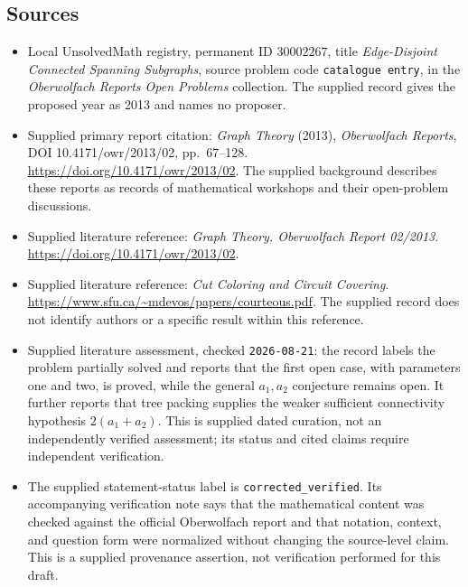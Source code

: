 \documentclass[11pt]{article}
\begin{document}
\subsection{Sources}
\begin{itemize}
\item Local UnsolvedMath registry, permanent ID \(30002267\), title \emph{Edge-Disjoint Connected Spanning Subgraphs}, source problem code \texttt{catalogue entry}, in the \emph{Oberwolfach Reports Open Problems} collection. The supplied record gives the proposed year as 2013 and names no proposer.
\item Supplied primary report citation: \emph{Graph Theory} (2013), \emph{Oberwolfach Reports}, DOI 10.4171/owr/2013/02, pp.\ 67--128. \url{https://doi.org/10.4171/owr/2013/02}. The supplied background describes these reports as records of mathematical workshops and their open-problem discussions.
\item Supplied literature reference: \emph{Graph Theory, Oberwolfach Report 02/2013}. \url{https://doi.org/10.4171/owr/2013/02}.
\item Supplied literature reference: \emph{Cut Coloring and Circuit Covering}. \url{https://www.sfu.ca/~mdevos/papers/courteous.pdf}. The supplied record does not identify authors or a specific result within this reference.
\item Supplied literature assessment, checked \texttt{2026-08-21}: the record labels the problem partially solved and reports that the first open case, with parameters one and two, is proved, while the general \(a_1,a_2\) conjecture remains open. It further reports that tree packing supplies the weaker sufficient connectivity hypothesis \(2(a_1+a_2)\). This is supplied dated curation, not an independently verified assessment; its status and cited claims require independent verification.
\item The supplied statement-status label is \texttt{corrected\_verified}. Its accompanying verification note says that the mathematical content was checked against the official Oberwolfach report and that notation, context, and question form were normalized without changing the source-level claim. This is a supplied provenance assertion, not verification performed for this draft.
\end{itemize}
\end{document}
